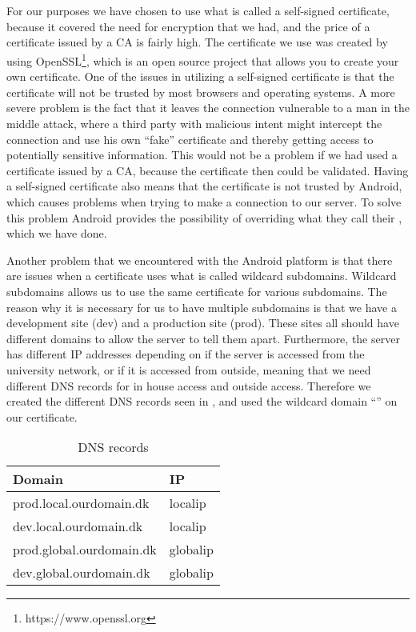 \\\\
For our purposes we have chosen to use what is called a self-signed certificate, because it covered the need for encryption that we had, and the price of a certificate issued by a CA is fairly high. The certificate we use was created by using OpenSSL\footnote{https://www.openssl.org}, which is an open source project that allows you to create your own certificate. One of the issues in utilizing a self-signed certificate is that the certificate will not be trusted by most browsers and operating systems. A more severe problem is the fact that it leaves the connection vulnerable to a man in the middle attack, where a third party with malicious intent might intercept the connection and use his own ``fake'' certificate and thereby getting access to potentially sensitive information. This would not be a problem if we had used a certificate issued by a CA, because the certificate then could be validated. 
Having a self-signed certificate also means that the certificate is not trusted by Android, which causes problems when trying to make a connection to our server. To solve this problem Android provides the possibility of overriding what they call their , which we have done. 


Another problem that we encountered with the Android platform is that there are issues when a certificate uses what is called wildcard subdomains. Wildcard subdomains allows us to use the same certificate for various subdomains. The reason why it is necessary for us to have multiple subdomains is that we have a development site (dev) and a production site (prod). These sites all should have different domains to allow the server to tell them apart. Furthermore, the server has different IP addresses depending on if the server is accessed from the university network, or if it is accessed from outside, meaning that we need different DNS records for in house access and outside access. Therefore we created the different DNS records seen in , and used the wildcard domain ``'' on our certificate.

\begin{table}[!htbp]
	\centering
	\begin{tabular}{|l|l|} \hline
		\textbf{Domain}				& \textbf{IP}	\\ \hline
		prod.local.ourdomain.dk 	& localip		\\ \hline 
		dev.local.ourdomain.dk 		& localip		\\ \hline
		prod.global.ourdomain.dk 	& globalip		\\ \hline
		dev.global.ourdomain.dk 	& globalip		\\ \hline
	\end{tabular}
	\caption{DNS records}
	\label{tab:dns}
\end{table}

